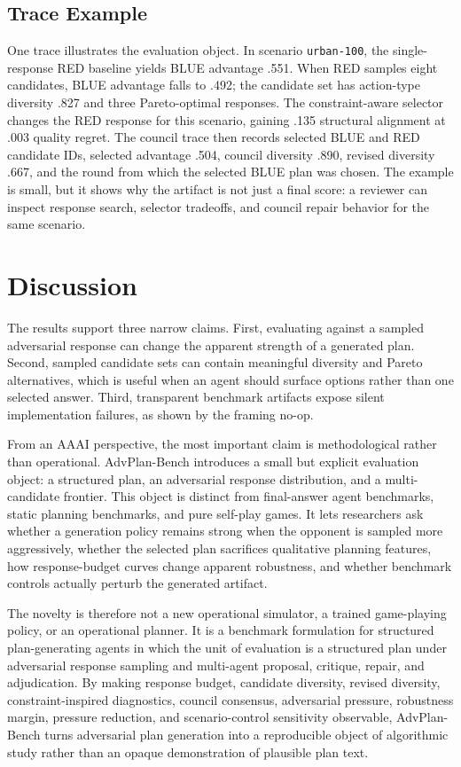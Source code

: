 \documentclass[letterpaper]{article} %
\begin{document}
\subsection{Trace Example}

One trace illustrates the evaluation object. In scenario \texttt{urban-100}, the single-response RED baseline yields BLUE advantage .551. When RED samples eight candidates, BLUE advantage falls to .492; the candidate set has action-type diversity .827 and three Pareto-optimal responses. The constraint-aware selector changes the RED response for this scenario, gaining .135 structural alignment at .003 quality regret. The council trace then records selected BLUE and RED candidate IDs, selected advantage .504, council diversity .890, revised diversity .667, and the round from which the selected BLUE plan was chosen. The example is small, but it shows why the artifact is not just a final score: a reviewer can inspect response search, selector tradeoffs, and council repair behavior for the same scenario.

\section{Discussion}

The results support three narrow claims. First, evaluating against a sampled adversarial response can change the apparent strength of a generated plan. Second, sampled candidate sets can contain meaningful diversity and Pareto alternatives, which is useful when an agent should surface options rather than one selected answer. Third, transparent benchmark artifacts expose silent implementation failures, as shown by the framing no-op.

From an AAAI perspective, the most important claim is methodological rather than operational. AdvPlan-Bench introduces a small but explicit evaluation object: a structured plan, an adversarial response distribution, and a multi-candidate frontier. This object is distinct from final-answer agent benchmarks, static planning benchmarks, and pure self-play games. It lets researchers ask whether a generation policy remains strong when the opponent is sampled more aggressively, whether the selected plan sacrifices qualitative planning features, how response-budget curves change apparent robustness, and whether benchmark controls actually perturb the generated artifact.

The novelty is therefore not a new operational simulator, a trained game-playing policy, or an operational planner. It is a benchmark formulation for structured plan-generating agents in which the unit of evaluation is a structured plan under adversarial response sampling and multi-agent proposal, critique, repair, and adjudication. By making response budget, candidate diversity, revised diversity, constraint-inspired diagnostics, council consensus, adversarial pressure, robustness margin, pressure reduction, and scenario-control sensitivity observable, AdvPlan-Bench turns adversarial plan generation into a reproducible object of algorithmic study rather than an opaque demonstration of plausible plan text.
\end{document}
